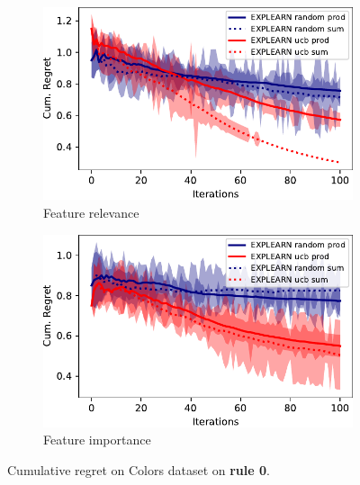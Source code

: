 \documentclass[letterpaper]{article} %
\newcommand{\colors}{{\sf Colors}\xspace}
\begin{document}
\begin{figure}[tb]
\centering
    \begin{subfigure}{.23\textwidth}
      \centering
      \includegraphics[width=\textwidth]{images/colors-0-relevance.pdf}
      \caption{Feature relevance}
      \label{fig:colors-0-rel}
    \end{subfigure}
    \begin{subfigure}{.23\textwidth}
      \centering
      \includegraphics[width=\textwidth]{images/colors-0-polarity.pdf}
      \caption{Feature importance}
      \label{fig:colors-0-pol}
    \end{subfigure}
    \caption{Cumulative regret on \colors dataset on \textbf{rule 0}.}
    \label{fig:colors-0}
\end{figure}
\end{document}
